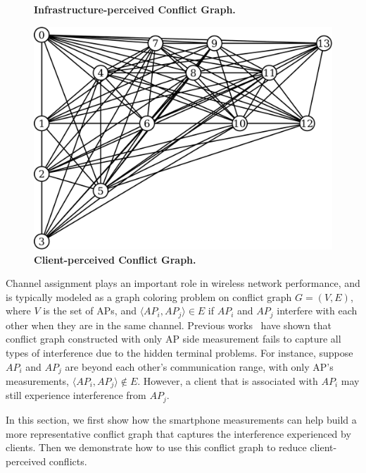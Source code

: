 \begin{figure}[t]
\begin{minipage}[t]{0.33\textwidth}
    \caption{\textbf{Infrastructure-perceived Conflict Graph.}}
    \label{fig:ap_conflict}
  \end{minipage}\hspace{0.01\textwidth}%
  \begin{minipage}[t]{0.33\textwidth}
    \includegraphics[width=\textwidth]{./figures/DavisConflictGraphSeparate-Client.pdf}
    \caption{\textbf{Client-perceived Conflict Graph.}}
    \label{fig:client_conflict}
  \end{minipage}
  \vspace*{\aftercaptiongap}
\end{figure}


Channel assignment plays an important role in wireless network performance, and
is typically modeled as a graph coloring problem on conflict graph $G=(V, E)$,
where $V$ is the set of APs, and $\langle AP_i, AP_j \rangle \in E$ if $AP_i$
and $AP_j$ interfere with each other when they are in the same channel. Previous
works~\cite{mishra2005weighted,mishra2006client} have shown that conflict graph
constructed with only AP side measurement fails to capture all types of interference
due to the hidden terminal problems. For instance, suppose
$AP_i$ and $AP_j$ are beyond each other's communication range, with only AP's
measurements, $\langle AP_i, AP_j \rangle \notin E$. However, a client that is
associated with $AP_i$ may still experience interference from $AP_j$.

In this section, we first show how the smartphone measurements can help build a
more representative conflict graph that captures the interference experienced by
clients. Then we demonstrate how to use this conflict graph to reduce
client-perceived conflicts.

